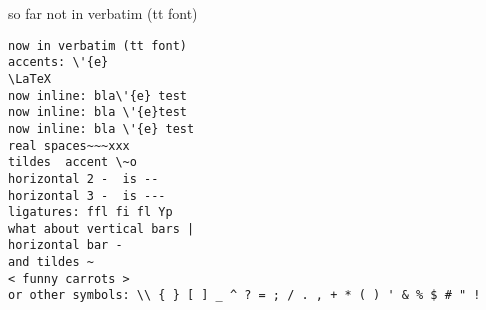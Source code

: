 so far  not in verbatim (tt font)

\begin{verbatim}
now in verbatim (tt font)
accents: \'{e}
\LaTeX
now inline: bla\'{e} test
now inline: bla \'{e}test
now inline: bla \'{e} test
real spaces~~~xxx
tildes  accent \~o
horizontal 2 -  is -- 
horizontal 3 -  is --- 
ligatures: ffl fi fl Yp
what about vertical bars |
horizontal bar -
and tildes ~
< funny carrots >
or other symbols: \\ { } [ ] _ ^ ? = ; / . , + * ( ) ' & % $ # " !
\end{verbatim}


